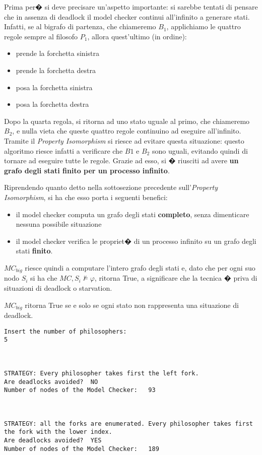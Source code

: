 Prima per� si deve precisare un'aspetto importante: si sarebbe tentati di pensare che in assenza di deadlock il model checker continui all'infinito a generare stati. Infatti, se al bigrafo di partenza, che chiameremo $B_1$, applichiamo le quattro regole sempre al filosofo $P_1$, allora quest'ultimo (in ordine):
\begin{itemize}
	\item
	prende la forchetta sinistra
	\item
	prende la forchetta destra
	\item
	posa la forchetta sinistra
	\item
	posa la forchetta destra
\end{itemize}
Dopo la quarta regola, si ritorna ad uno stato uguale al primo, che chiameremo $B_2$, e nulla vieta che queste quattro regole continuino ad eseguire all'infinito. Tramite il \emph{Property Isomorphism} si riesce ad evitare questa situazione: questo algoritmo riesce infatti a verificare che $B1$ e $B_2$ sono uguali, evitando quindi di tornare ad eseguire tutte le regole. Grazie ad esso, si � riusciti ad avere \textbf{un grafo degli stati finito per un processo infinito}.

Riprendendo quanto detto nella sottosezione precedente sull'\emph{Property Isomorphism}, si ha che esso porta i seguenti benefici:
\begin{itemize}
	\item
	il model checker computa un grafo degli stati \textbf{completo}, senza dimenticare nessuna possibile situazione
	\item
	il model checker verifica le propriet� di un processo infinito su un grafo degli stati \textbf{finito}.
\end{itemize}

$MC_{big}$ riesce quindi a computare l'intero grafo degli stati e, dato che per ogni suo nodo $S_i$ si ha che $MC,S_i \not \models \varphi$, ritorna True, a significare che la tecnica � priva di situazioni di deadlock o starvation.

\begin{prop}
$MC_{big}$ ritorna True se e solo se ogni stato non rappresenta una situazione di deadlock.
\end{prop}

\begin{lstlisting}
Insert the number of philosophers: 
5



STRATEGY: Every philosopher takes first the left fork.
Are deadlocks avoided?	NO
Number of nodes of the Model Checker:	93



STRATEGY: all the forks are enumerated. Every philosopher takes first the fork with the lower index.
Are deadlocks avoided?	YES
Number of nodes of the Model Checker:	189
\end{lstlisting}



